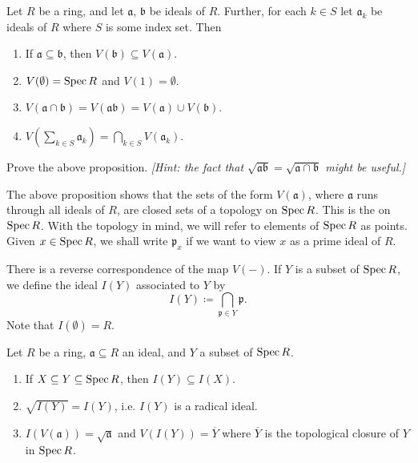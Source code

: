 \begin{proposition}\label{chap2:zariski-topology}
	Let $R$ be a ring, and let $\mathfrak{a}$, $\mathfrak{b}$ be ideals of $R$. Further, for each $k \in S$ let $\mathfrak{a}_k$ be ideals of $R$ where $S$ is some index set. Then
	
	\begin{enumerate}
		\item If $\mathfrak{a} \subseteq \mathfrak{b}$, then $V(\mathfrak{b}) \subseteq V(\mathfrak{a})$.
		
		\item $V(\emptyset) = \operatorname{Spec} R$ and $V(1) = \emptyset$.
		
		\item $V(\mathfrak{a} \cap \mathfrak{b}) = V(\mathfrak{a}\mathfrak{b}) = V(\mathfrak{a}) \cup V(\mathfrak{b})$.
		
		\item $V(\sum_{k \in S} \mathfrak{a}_k) = \bigcap_{k \in S} V(\mathfrak{a}_k)$.
	\end{enumerate}
\end{proposition}
\begin{exercise}
	Prove the above proposition. \textit{[Hint: the fact that $\sqrt{\mathfrak{a}\mathfrak{b}} = \sqrt{\mathfrak{a} \cap \mathfrak{b}}$ might be useful.]}
\end{exercise}

The above proposition shows that the sets of the form $V(\mathfrak{a})$, where $\mathfrak{a}$ runs through all ideals of $R$, are closed sets of a topology on $\operatorname{Spec} R$. This is the  on $\operatorname{Spec} R$. With the topology in mind, we will refer to elements of $\operatorname{Spec} R$ as points. Given $x \in \operatorname{Spec} R$, we shall write $\mathfrak{p}_x$ if we want to view $x$ as a prime ideal of $R$.

There is a reverse correspondence of the map $V(-)$. If $Y$ is a subset of $\operatorname{Spec} R$, we define the ideal $I(Y)$ associated to $Y$ by
\begin{equation*}
	I(Y) \coloneqq \bigcap_{\mathfrak{p} \in Y} \mathfrak{p}.
\end{equation*}
Note that $I(\emptyset) = R$. 

\begin{proposition}\label{chap2:I-and-V-correspondence}
	Let $R$ be a ring, $\mathfrak{a} \subseteq R$ an ideal, and $Y$ a subset of $\operatorname{Spec} R$.
	\begin{enumerate}
		\item If $X \subseteq Y \subseteq \operatorname{Spec} R$, then $I(Y) \subseteq I(X)$.
		\item $\sqrt{I(Y)} = I(Y)$, i.e. $I(Y)$ is a radical ideal.
		\item $I(V(\mathfrak{a})) = \sqrt{\mathfrak{a}}$ and $V(I(Y)) = \overline{Y}$ where $\overline{Y}$ is the topological closure of $Y$ in $\operatorname{Spec} R$.
	\end{enumerate}
\end{proposition}


